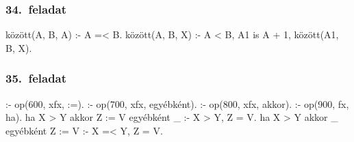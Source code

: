 \subsubsection*{34.~feladat}
\begin{program}
között(A, B, A) :- A =< B. 
között(A, B, X) :-
    A < B, A1 is A + 1,
    között(A1, B, X). 
\end{program}
\subsubsection*{35.~feladat}
\begin{program}
:- op(600, xfx, :=). 
:- op(700, xfx, egyébként). 
:- op(800, xfx, akkor). 
:- op(900, fx, ha). 
ha X > Y akkor Z := V egyébként _ :- X > Y, Z = V. 
ha X > Y akkor _ egyébként Z := V :- X =< Y, Z = V. 
\end{program}
